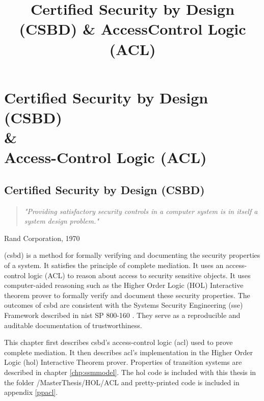 \documentclass[../../main/main.tex]{subfiles}
\begin{document}
\title{Certified Security by Design (CSBD) \& Access\-Control Logic (ACL)}

\chapter[Certified Security by Design (CSBD) \& Access-Control Logic (ACL)]{Certified Security by Design (CSBD)  \\ \& \\ Access-Control Logic (ACL)} \label{chp:csbdacl}


\section{Certified Security by Design (CSBD)} \label{sec:csbd}

\begin{quote}
\textit{
"Providing satisfactory security controls in a computer system is in itself a system design problem."}  
\end{quote}

\begin{flushright}
Rand Corporation, 1970 \cite{defensescienceboard}
\end{flushright}

 (\gls{csbd}) is a method for formally verifying and documenting the security properties of a system.  It satisfies the principle of complete mediation.  It uses an access-control logic (ACL) to reason about access to security sensitive objects.  It uses computer-aided reasoning such as the Higher Order Logic (HOL) Interactive theorem prover to formally verify and document these security properties.  The outcomes of \gls{csbd} are consistent with the Systems Security Engineering (\gls{sse}) Framework described in \gls{nist} SP 800-160 \cite{NIST800160}.  They serve as a reproducible and auditable documentation of trustworthiness.

This chapter first describes \gls{csbd}'s access-control logic (\gls{acl}) used to prove complete mediation.  It then describes \gls{acl}'s implementation in the Higher Order Logic (\gls{hol}) Interactive Theorem prover.  Properties of transition systems are described in chapter \ref{chp:ssmmodel}.  The \gls{hol} code is included with this thesis in the folder /MasterThesis/HOL/ACL and pretty-printed code is included in appendix \ref{ppacl}.

\end{document}
